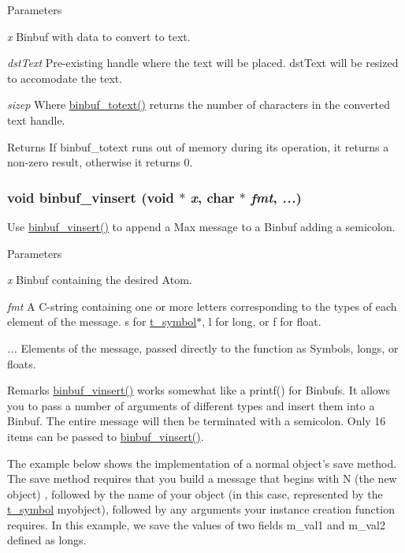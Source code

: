 \begin{DoxyParams}{Parameters}
\item[{\em x}]Binbuf with data to convert to text. \item[{\em dstText}]Pre-\/existing handle where the text will be placed. dstText will be resized to accomodate the text. \item[{\em sizep}]Where \hyperlink{group__binbuf_ga739086c676dfaba01dff1f70e7487dd5}{binbuf\_\-totext()} returns the number of characters in the converted text handle. \end{DoxyParams}
\begin{DoxyReturn}{Returns}
If binbuf\_\-totext runs out of memory during its operation, it returns a non-\/zero result, otherwise it returns 0. 
\end{DoxyReturn}
\hypertarget{group__binbuf_ga8bc71e59211549a9927754452b2d9e21}{
\subsubsection[{binbuf\_\-vinsert}]{\setlength{\rightskip}{0pt plus 5cm}void binbuf\_\-vinsert (void $\ast$ {\em x}, \/  char $\ast$ {\em fmt}, \/   {\em ...})}}
\label{group__binbuf_ga8bc71e59211549a9927754452b2d9e21}


Use \hyperlink{group__binbuf_ga8bc71e59211549a9927754452b2d9e21}{binbuf\_\-vinsert()} to append a Max message to a Binbuf adding a semicolon. 
\begin{DoxyParams}{Parameters}
\item[{\em x}]Binbuf containing the desired Atom. \item[{\em fmt}]A C-\/string containing one or more letters corresponding to the types of each element of the message. s for \hyperlink{structt__symbol}{t\_\-symbol}$\ast$, l for long, or f for float. \item[{\em ...}]Elements of the message, passed directly to the function as Symbols, longs, or floats.\end{DoxyParams}
\begin{DoxyRemark}{Remarks}
\hyperlink{group__binbuf_ga8bc71e59211549a9927754452b2d9e21}{binbuf\_\-vinsert()} works somewhat like a printf() for Binbufs. It allows you to pass a number of arguments of different types and insert them into a Binbuf. The entire message will then be terminated with a semicolon. Only 16 items can be passed to \hyperlink{group__binbuf_ga8bc71e59211549a9927754452b2d9e21}{binbuf\_\-vinsert()}.
\end{DoxyRemark}
The example below shows the implementation of a normal object’s save method. The save method requires that you build a message that begins with N (the new object) , followed by the name of your object (in this case, represented by the \hyperlink{structt__symbol}{t\_\-symbol} myobject), followed by any arguments your instance creation function requires. In this example, we save the values of two fields m\_\-val1 and m\_\-val2 defined as longs.


